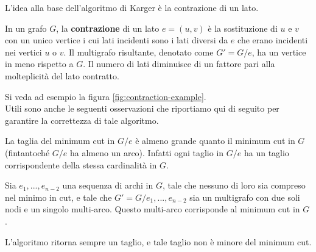 L'idea alla base dell'algoritmo di Karger è la contrazione di un lato.

\begin{defn}
In un grafo $ G $, la \textbf{contrazione} di un lato $e = (u,v)$ è la sostituzione di $ u $ e $ v $ con un unico vertice i cui lati incidenti sono i lati diversi da $ e $ che erano incidenti nei vertici $ u $ o $ v $.
Il multigrafo risultante, denotato come $G' = G/e$, ha un vertice in meno rispetto a $G$. Il numero di lati diminuisce di un fattore pari alla molteplicità del lato contratto.
\end{defn}

\noindent Si veda ad esempio la figura \ref{fig:contraction-example}.\\

\noindent Utili sono anche le seguenti osservazioni che riportiamo qui di seguito per garantire la correttezza di tale algoritmo.

\begin{obser}
La taglia del minimum cut in $ G/e $ è almeno grande quanto il minimum cut in $ G $  (fintantoché $ G/e $ ha almeno un arco). Infatti ogni taglio in $ G/e $ ha un taglio corrispondente della stessa cardinalità in $ G $.
\end{obser}

\begin{obser}
Sia $ e_1,...,e_{n-2} $ una sequenza di archi in $ G $, tale che nessuno di loro sia compreso nel minimo in cut, e tale che $ G'=G/{ e_1,...,e_{n-2}} $ sia un multigrafo con due soli nodi e un singolo multi-arco. Questo multi-arco corrisponde al minimum cut in $ G $.
\end{obser}

\begin{obser}
L'algoritmo ritorna sempre un taglio, e tale taglio non è minore del minimum cut.
\end{obser}



